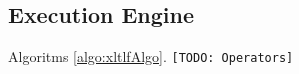 
\subsection{Execution Engine} \label{ssec:xltlf}
Algoritms \ref{algo:xltlfAlgo}. \texttt{\color{red}[TODO: \xLTLf Operators]} 
